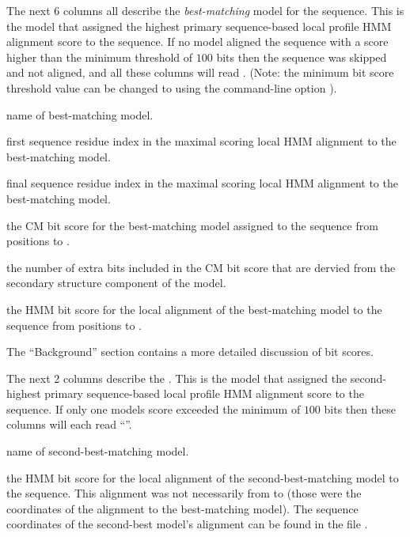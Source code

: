 The next 6 columns all describe the \emph{best-matching} model for the
sequence. This is the model that assigned the highest primary
sequence-based local profile HMM alignment score to the sequence. 
If no model aligned the sequence with a score higher than the minimum
threshold of $100$ bits then the sequence was skipped and not
aligned, and all these columns will read \prog{-}. (Note: the minimum
bit score threshold value can be changed to  using the
 command-line option ). 

\begin{wideitem}
\item[\emprog{model name}] name of best-matching model.

\item[\emprog{beg}] first sequence residue index in the maximal
  scoring local HMM alignment to the best-matching model.

\item[\emprog{end}] final sequence residue index in the maximal
  scoring local HMM alignment to the best-matching model.

\item[\emprog{CM sc}] the CM bit score for the best-matching model
  assigned to the sequence from positions  to .

\item[\emprog{struct}] the number of extra bits included in the
  CM bit score that are dervied from the secondary structure component
  of the model.

\item[\emprog{HMM sc}] the HMM bit score for the local alignment of
  the best-matching model to the sequence from positions  to
  .
\end{wideitem}

The ``Background'' section contains a more detailed discussion of bit
scores.

The next 2 columns describe the . This is the
model that assigned the second-highest primary sequence-based local 
profile HMM alignment score to the sequence. If only one models score
exceeded the minimum of $100$ bits then these columns will each read
``\prog{-}''.

\begin{wideitem}
\item[\emprog{model name}] name of second-best-matching model.

\item[\emprog{HMM sc}] the HMM bit score for the local alignment of
  the second-best-matching model to the sequence. This alignment was
  not necessarily from  to  (those were the
  coordinates of the alignment to the best-matching model). The
  sequence coordinates of the second-best model's alignment can be
  found in the file .
\end{wideitem}


